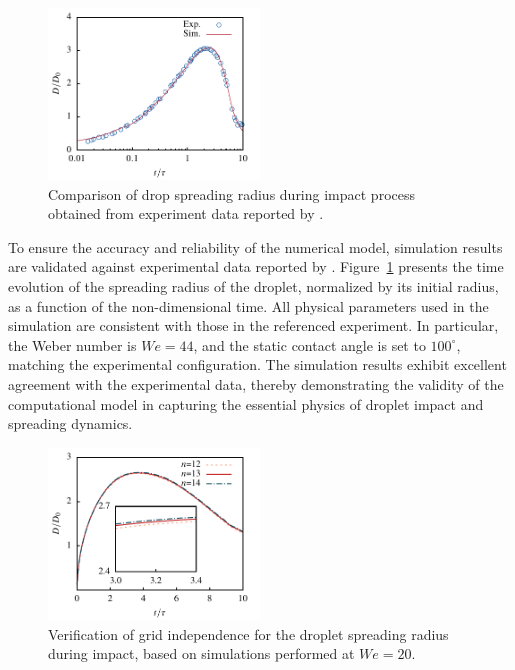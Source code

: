 \documentclass[lineno]{cls/jfm}
\begin{document}
 \begin{figure}
  \centerline{\includegraphics[width=0.5\textwidth]{fig/Verity.pdf}}
  \caption{Comparison of drop spreading radius during impact process obtained from experiment data reported by \cite{sikalo_analysis_2002}.}
 \label{fig:verity}
 \end{figure}


To ensure the accuracy and reliability of the numerical model, simulation results are validated against experimental data reported by \citet{sikalo_analysis_2002}. Figure~\ref{fig:verity} presents the time evolution of the spreading radius of the droplet, normalized by its initial radius, as a function of the non-dimensional time. All physical parameters used in the simulation are consistent with those in the referenced experiment. In particular, the Weber number is $We = 44$, and the static contact angle is set to $100^\circ$, matching the experimental configuration. The simulation results exhibit excellent agreement with the experimental data, thereby demonstrating the validity of the computational model in capturing the essential physics of droplet impact and spreading dynamics.

 \begin{figure}
  \centerline{\includegraphics[width=0.5\textwidth]{fig/mesh.pdf}}
  \caption{Verification of grid independence for the droplet spreading radius during impact, based on simulations performed at $\mathit{We}=20$.}
 \label{fig:mesh}
 \end{figure}
\end{document}
